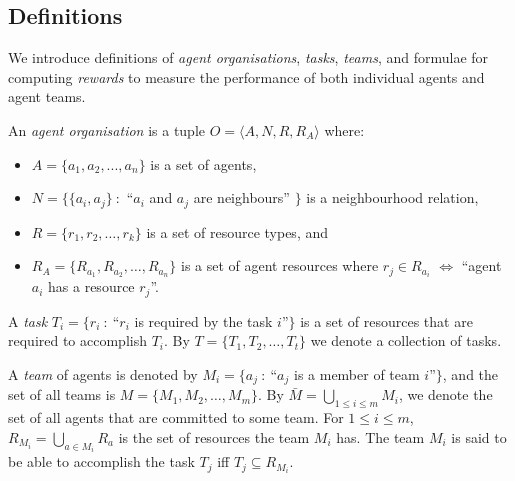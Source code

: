 \documentclass{llncs}
\begin{document}
\subsection{Definitions}
\vspace{-5pt}
We introduce definitions of \emph{agent organisations}, \emph{tasks}, \emph{teams}, and formulae for computing \emph{rewards} to measure the performance of both individual agents and agent teams.
\begin{definition}
An \emph{agent organisation} is a tuple $O=\langle A, N, R, R_A  \rangle$ where:
\vspace{-5pt}
\noindent
\begin{itemize}
\item $A= \{ a_1,a_2,...,a_n \} $ is a set of agents,
\item $N=\{\{a_i,a_j \}\ :$ ``$a_i$ and $a_j$ are neighbours'' $\}$ is a neighbourhood relation,
\item $R=\{r_1,r_2,\dots,r_k\}$ is a set of resource types, and
\item $R_A=\{R_{a_1}, R_{a_2}, \dots, R_{a_n}\}$ is a set of agent resources where $r_j \in R_{a_i} $ $\iff$ ``agent $a_i$ has a resource $r_j$''.
\end{itemize}
\vspace{-5pt}
\end{definition}

\begin{definition}[Task]
A \emph{task} $T_i=\{r_i\ :\ $``$r_i$ is required by the task $i$''$\}$ is a set of resources that are required to accomplish $T_i$. By $T=\{T_1, T_2,\dots, T_t\}$ we denote a collection of tasks.
\end{definition}

\begin{definition}[Team]
A \emph{team} of agents is denoted by $M_i=\{a_j\ :\ $``$a_j$ is a member of team $i$''$\}$, and the set of all teams is $M=\{M_1, M_2,\dots , M_m\}$. By $\bar{M} = \bigcup_{1\leq i\leq m} M_i$, we denote the set of all agents that are committed to some team. For $1\leq i\leq m$, $R_{M_i}=\bigcup_{a \in M_i}R_{a}$ is the set of resources the team $M_i$ has. The team $M_i$ is said to be able to accomplish the task $T_j$ iff $T_j \subseteq R_{M_i}$.
\end{definition}
\end{document}
